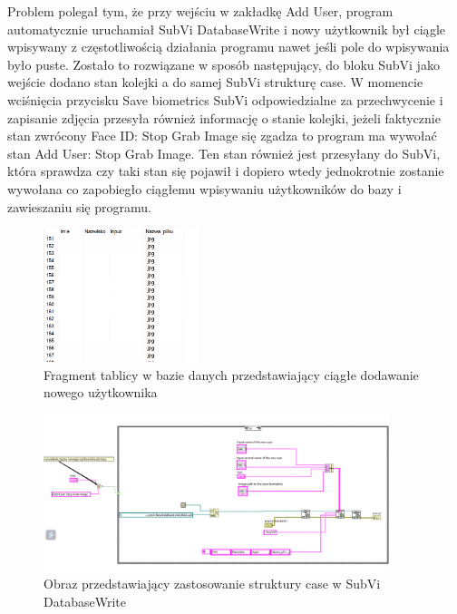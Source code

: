 \documentclass{report}
\begin{document}
Problem polegał tym, że przy wejściu w zakładkę Add User, program automatycznie uruchamiał SubVi DatabaseWrite i nowy użytkownik był ciągle wpisywany z częstotliwością działania programu nawet jeśli pole do wpisywania
było puste. Zostało to rozwiązane w sposób następujący, do bloku SubVi jako wejście dodano stan kolejki a do samej SubVi strukturę case. W momencie wciśnięcia przycisku Save biometrics
SubVi odpowiedzialne za przechwycenie i zapisanie zdjęcia przesyła również informację o stanie kolejki, jeżeli faktycznie stan zwrócony Face ID: Stop Grab Image się zgadza to program ma wywołać stan 
Add User: Stop Grab Image. Ten stan również jest przesyłany do SubVi, która sprawdza czy taki stan się pojawił i dopiero wtedy jednokrotnie zostanie wywołana co zapobiegło ciągłemu wpisywaniu użytkowników
do bazy i zawieszaniu się programu.

\begin{figure}[H]
    \centering
    \includegraphics[width=0.4\textwidth]{src/Database/Write_spam.png}
    \caption{Fragment tablicy w bazie danych przedstawiający ciągłe dodawanie nowego użytkownika}
    \label{fig:tab-control-page}
\end{figure}

\begin{figure}[H]
    \centering
    \includegraphics[width=0.9\textwidth]{src/Database/Database_write_subvi.png}
    \caption{Obraz przedstawiający zastosowanie struktury case w SubVi DatabaseWrite}
    \label{fig:first-att}
\end{figure}
\end{document}
